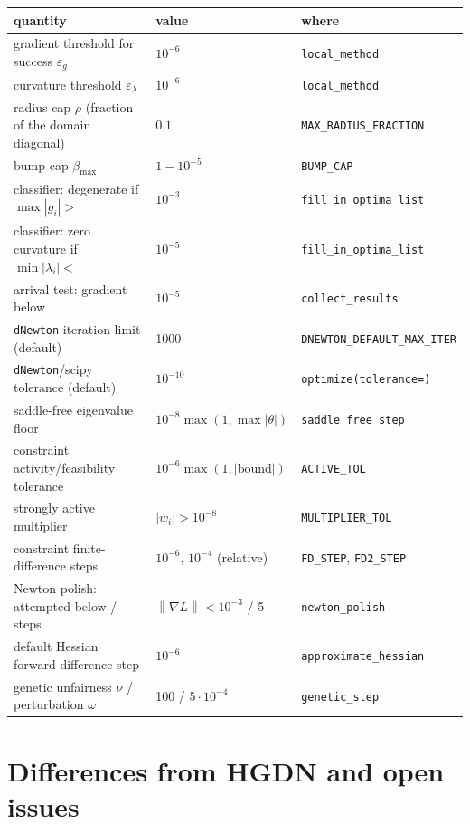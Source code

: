 \documentclass[11pt]{article}
\newcommand{\norm}[1]{\left\lVert #1 \right\rVert}
\newcommand{\code}[1]{\texttt{#1}}
\begin{document}
\begin{center}
\small
\begin{tabular}{lll}
\toprule
quantity & value & where \\
\midrule
gradient threshold for success $\varepsilon_g$ & $10^{-6}$ & \code{local\_method} \\
curvature threshold $\varepsilon_\lambda$ & $10^{-6}$ & \code{local\_method} \\
radius cap $\rho$ (fraction of the domain diagonal) & $0.1$ & \code{MAX\_RADIUS\_FRACTION} \\
bump cap $\beta_{\max}$ & $1 - 10^{-5}$ & \code{BUMP\_CAP} \\
classifier: degenerate if $\max|g_i| >$ & $10^{-3}$ & \code{fill\_in\_optima\_list} \\
classifier: zero curvature if $\min|\lambda_i| <$ & $10^{-5}$ & \code{fill\_in\_optima\_list} \\
arrival test: gradient below & $10^{-5}$ & \code{collect\_results} \\
\code{dNewton} iteration limit (default) & 1000 & \code{DNEWTON\_DEFAULT\_MAX\_ITER} \\
\code{dNewton}/scipy tolerance (default) & $10^{-10}$ & \code{optimize(tolerance=)} \\
saddle-free eigenvalue floor & $10^{-8}\max(1,\max|\theta|)$ & \code{saddle\_free\_step} \\
constraint activity/feasibility tolerance & $10^{-6}\max(1,|\text{bound}|)$ & \code{ACTIVE\_TOL} \\
strongly active multiplier & $|w_i| > 10^{-8}$ & \code{MULTIPLIER\_TOL} \\
constraint finite-difference steps & $10^{-6}$, $10^{-4}$ (relative) & \code{FD\_STEP}, \code{FD2\_STEP} \\
Newton polish: attempted below / steps & $\norm{\nabla L} < 10^{-3}$ / 5 & \code{newton\_polish} \\
default Hessian forward-difference step & $10^{-6}$ & \code{approximate\_hessian} \\
genetic unfairness $\nu$ / perturbation $\omega$ & 100 / $5\cdot 10^{-4}$ & \code{genetic\_step} \\
\bottomrule
\end{tabular}
\end{center}

\section{Differences from HGDN and open issues}\label{sec:limits}
\end{document}
